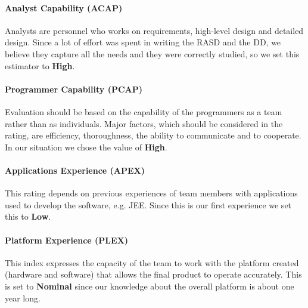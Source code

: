 \paragraph{Analyst Capability (ACAP)} Analysts are personnel who works on requirements, high-level design and detailed design. Since a lot of effort was spent in writing the RASD and the DD, we believe they capture all the needs and they were correctly studied, so we set this estimator to \textbf{High}.


\paragraph{Programmer Capability (PCAP)} Evaluation should be based on the capability of the programmers as a team rather than as individuals. Major factors, which should be considered in the rating, are efficiency, thoroughness, the ability to communicate and to cooperate. In our situation we chose the value of \textbf{High}.


\paragraph{Applications Experience (APEX)} This rating depends on previous experiences of team members with applications used to develop the software, e.g. JEE. Since this is our first experience we set this to \textbf{Low}.


\paragraph{Platform Experience (PLEX)} This index expresses the capacity of the team to work with the platform created (hardware and software) that allows the final product to operate accurately. 
This is set to \textbf{Nominal} since our knowledge about the overall platform is about one year long.
   
